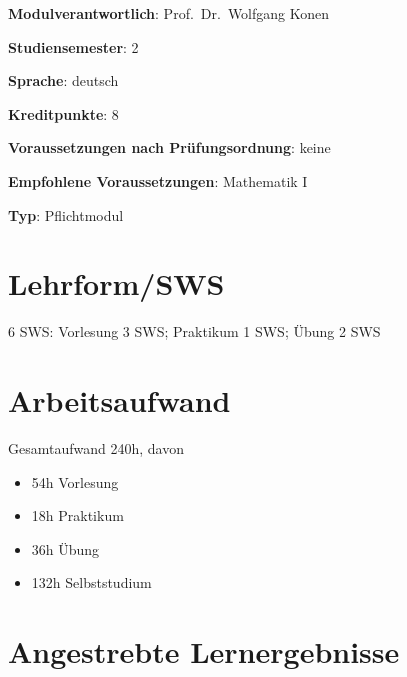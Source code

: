 \begin{modulHead}
\textbf{Modulverantwortlich}: Prof.~Dr.~Wolfgang
Konen
\end{modulHead}
\begin{modulHead}
\textbf{Studiensemester}:
2
\end{modulHead}
\begin{modulHead}
\textbf{Sprache}:
deutsch
\end{modulHead}
\begin{modulHead}
\textbf{Kreditpunkte}:
8
\end{modulHead}
\begin{modulHead}
\textbf{Voraussetzungen nach
Prüfungsordnung}:
keine
\end{modulHead}
\begin{modulHead}
\textbf{Empfohlene
Voraussetzungen}: Mathematik
I
\end{modulHead}
\begin{modulHead}
\textbf{Typ}:
Pflichtmodul
\end{modulHead}


\section*{Lehrform/SWS\label{/mi-2017/modulbeschreibungen-bachelor/BA_Mathematik2}}\label{lehrformswspathlabelmi-2017modulbeschreibungen-bachelorbaux5fmathematik2}

6 SWS: Vorlesung 3 SWS; Praktikum 1 SWS; Übung 2 SWS

\section*{Arbeitsaufwand\label{/mi-2017/modulbeschreibungen-bachelor/BA_Mathematik2}}\label{arbeitsaufwandpathlabelmi-2017modulbeschreibungen-bachelorbaux5fmathematik2}

Gesamtaufwand 240h, davon

\begin{itemize}
\tightlist
\item
  54h Vorlesung
\item
  18h Praktikum
\item
  36h Übung
\item
  132h Selbststudium
\end{itemize}

\section*{Angestrebte
Lernergebnisse\label{/mi-2017/modulbeschreibungen-bachelor/BA_Mathematik2}}\label{angestrebte-lernergebnissepathlabelmi-2017modulbeschreibungen-bachelorbaux5fmathematik2}

